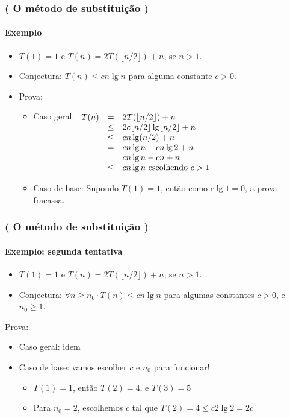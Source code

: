\documentclass{beamer}
\begin{document}
\begin{frame}

\frametitle{( O método de substituição )}
\framesubtitle{Exemplo}
\begin{itemize}
\item $T(1) = 1$ e $T(n) = 2 T (\lfloor n/2 \rfloor) + n$, se $n>1$.
\item Conjectura: $T(n) \le c n \lg n$ para alguma constante $c > 0$.
\item Prova:
  \begin{itemize}
  \item Caso geral:
    $\begin{array}[t]{rcl}
    T(n) & = & 2 T (\lfloor n/2 \rfloor) + n \\
    & \le & 2 c \lfloor n/2 \rfloor \lg \lfloor n / 2 \rfloor + n \\
    & \le & c n \lg(n / 2) + n \\
    & = & c n \lg n - c n \lg 2 + n \\
    & = & c n \lg n - c n + n \\
    & \le & c n \lg n \mbox{ escolhendo $c > 1$}
    \end{array}$
    \pause
  \item Caso de base:
    Supondo $T(1) = 1$, então como $c \lg 1 = 0$, a prova \alert{fracassa}.
  \end{itemize}
\end{itemize}
\end{frame}

\begin{frame}

\frametitle{( O método de substituição )}
\framesubtitle{Exemplo: segunda tentativa}
\begin{itemize}
\item $T(1) = 1$ e $T(n) = 2 T (\lfloor n/2 \rfloor) + n$, se $n>1$.
\item Conjectura: $\forall n \ge n_0 \cdot T(n) \le c n \lg n$ para algumas constantes $c > 0$, 
  e $n_0 \ge 1$.
\end{itemize}

Prova:
\begin{itemize}
\item Caso geral: idem
  \pause
\item Caso de base: vamos escolher $c$ e $n_0$ para funcionar!
  \begin{itemize}
  \item $T(1) = 1$, então $T(2) = 4$, e $T(3) = 5$
  \item Para $n_0 = 2$, escolhemos $c$ tal que $T(2) = 4 \le c 2 \lg 2 = 2c$
    \pause {}
  \end{itemize}
\end{itemize}
\end{frame}
\end{document}
